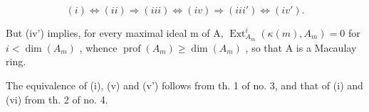 \[
(i) \Leftrightarrow (ii) \Rightarrow (iii) \Leftrightarrow (iv) \Rightarrow (iii') \Leftrightarrow (iv').
\]

But (iv') implies, for every maximal ideal m of A, \(\operatorname{Ext}_{A_{m}}^{i}(\kappa(m), A_{m}) = 0\) for \(i < \dim(A_{m})\) , whence \(\operatorname{prof}(A_{m}) \geqslant \dim(A_{m})\) , so that A is a Macaulay ring.

The equivalence of (i), (v) and (v') follows from th. 1 of no. 3, and that of (i) and (vi) from th. 2 of no. 4.

